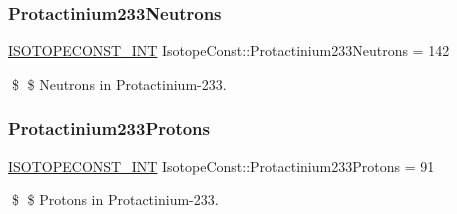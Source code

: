 \subsubsection{\texorpdfstring{Protactinium233\+Neutrons}{Protactinium233Neutrons}}
{\footnotesize\ttfamily \mbox{\hyperlink{group___isotope_const-_macros_ga5f18360b3e99483a35c32d789e62621c}{I\+S\+O\+T\+O\+P\+E\+C\+O\+N\+S\+T\+\_\+\+I\+NT}} Isotope\+Const\+::\+Protactinium233\+Neutrons = 142}

\$ \$ Neutrons in Protactinium-\/233. \mbox{\label{group___isotope_const-_protactinium-_pa233_ga7b6be5bf425fa1b68cfed7db65f3fa11}} 
\subsubsection{\texorpdfstring{Protactinium233\+Protons}{Protactinium233Protons}}
{\footnotesize\ttfamily \mbox{\hyperlink{group___isotope_const-_macros_ga5f18360b3e99483a35c32d789e62621c}{I\+S\+O\+T\+O\+P\+E\+C\+O\+N\+S\+T\+\_\+\+I\+NT}} Isotope\+Const\+::\+Protactinium233\+Protons = 91}

\$ \$ Protons in Protactinium-\/233. 
